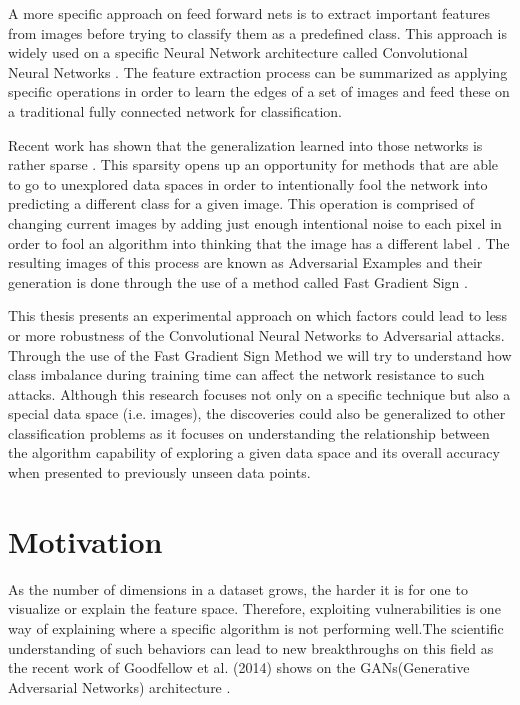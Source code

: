 A more specific approach on feed forward nets is to extract important features from images before trying to classify them as a predefined class. This approach is widely used on a specific Neural Network architecture called Convolutional Neural Networks \cite{matsugu2003subject}. The feature extraction process can be summarized as applying specific operations in order to learn the edges of a set of images and feed these on a traditional fully connected network for classification. 

Recent work has shown that the generalization learned into those networks is rather sparse \cite{goodfellow2016}. This sparsity opens up an opportunity for methods that are able to go to unexplored data spaces in order to intentionally fool the network into predicting a different class for a given image. This operation is comprised of changing current images by adding just enough intentional noise to each pixel in order to fool an algorithm into thinking that the image has a different label \cite{goodfellow2014}\cite{papernot2016transf}\cite{goodfellow2016}\cite{szegedy2013}. The resulting images of this process are known as Adversarial Examples and their generation is done through the use of a method called Fast Gradient Sign \cite{goodfellow2014}.

This thesis presents an experimental approach on which factors could lead to less or more robustness of the Convolutional Neural Networks to Adversarial attacks. Through the use of the Fast Gradient Sign Method we will try to understand how class imbalance during training time can affect the network resistance to such attacks. Although this research focuses not only on a specific technique but also a special data space (i.e. images), the discoveries could also be generalized to other classification problems as it focuses on understanding the relationship between the algorithm capability of exploring a given data space and its overall accuracy when presented to previously unseen data points.


\section{Motivation}

As the number of dimensions in a dataset grows, the harder it is for one to visualize or explain the feature space. Therefore, exploiting vulnerabilities is one way of explaining where a specific algorithm is not performing well.The scientific understanding of such behaviors can lead to new breakthroughs on this field as the recent work of Goodfellow et al. (2014) shows on the GANs(Generative Adversarial Networks) architecture \cite{goodfellow2014generative}. 

